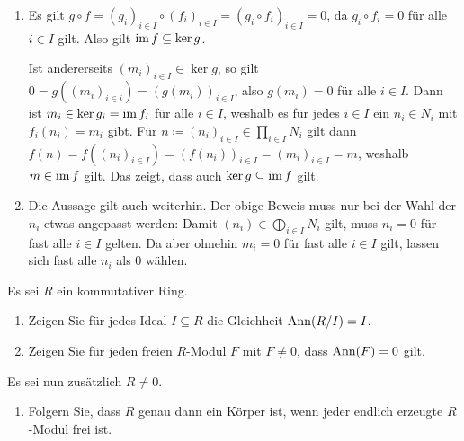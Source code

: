 \begin{solution}
  \begin{enumerate}
    \item
      Es gilt $g \circ f = (g_i)_{i \in I} \circ (f_i)_{i \in I} = (g_i \circ f_i)_{i \in I} = 0$, da $g_i \circ f_i = 0$ für alle $i \in I$ gilt.
      Also gilt $\operatorname{im} f \subseteq \ker g$.
      
      Ist andererseits $(m_i)_{i \in I} \in \ker g$, so gilt $0 = g((m_i)_{i \in i}) = (g(m_i))_{i \in I}$, also $g(m_i) = 0$ für alle $i \in I$.
      Dann ist $m_i \in \ker g_i = \operatorname{im} f_i$ für alle $i \in I$, weshalb es für jedes $i \in I$ ein $n_i \in N_i$ mit $f_i(n_i) = m_i$ gibt.
      Für $n \coloneqq (n_i)_{i \in I} \in \prod_{i \in I} N_i$ gilt dann $f(n) = f((n_i)_{i \in I}) = (f(n_i))_{i \in I} = (m_i)_{i \in I} = m$, weshalb $m \in \operatorname{im} f$ gilt.
      Das zeigt, dass auch $\ker g \subseteq \operatorname{im} f$ gilt.
    \item
      Die Aussage gilt auch weiterhin.
      Der obige Beweis muss nur bei der Wahl der $n_i$ etwas angepasst werden:
      Damit $(n_i) \in \bigoplus_{i \in I} N_i$ gilt, muss $n_i = 0$ für fast alle $i \in I$ gelten.
      Da aber ohnehin $m_i = 0$ für fast alle $i \in I$ gilt, lassen sich fast alle $n_i$ als $0$ wählen.
  \end{enumerate}
\end{solution}


\begin{question}[subtitle = Annihilatoren von Quotienten]
  \label{question: annihilators of quotients}
  Es sei $R$ ein kommutativer Ring.
  \begin{enumerate}
    \item
      Zeigen Sie für jedes Ideal $I \subseteq R$ die Gleichheit $\operatorname{Ann}(R/I) = I$.
    \item
      Zeigen Sie für jeden freien $R$-Modul $F$ mit $F \neq 0$, dass $\operatorname{Ann}(F) = 0$ gilt.
  \end{enumerate}
  Es sei nun zusätzlich $R \neq 0$.
  \begin{enumerate}[resume]
    \item
      Folgern Sie, dass $R$ genau dann ein Körper ist, wenn jeder endlich erzeugte $R$-Modul frei ist.
  \end{enumerate}
\end{question}


